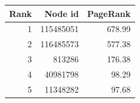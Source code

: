 \begin{tabular}{rrr}
\toprule
Rank & Node id & PageRank \\
\midrule
1 & 115485051 & 678.99 \\
2 & 116485573 & 577.38 \\
3 & 813286 & 176.38 \\
4 & 40981798 & 98.29 \\
5 & 11348282 & 97.68 \\
\bottomrule
\end{tabular}
